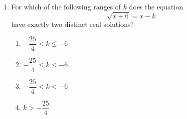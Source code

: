 \documentclass[12pt]{article}
\begin{document}
\begin{enumerate}[leftmargin=*,itemsep=1em]
  \vfill
  \item For which of the following ranges of $k$ does the equation
  \[
    \sqrt{x+6}=x-k
  \]
  have exactly two distinct real solutions?
  \begin{enumerate}[label=\Alph*.,itemsep=0.4em]
    \item $-\dfrac{25}{4}<k\le -6$
    \item $-\dfrac{25}{4}\le k\le -6$
    \item $-\dfrac{25}{4}<k<-6$
    \item $k>-\dfrac{25}{4}$
  \end{enumerate}
  \vfill
\end{enumerate}
\end{document}
